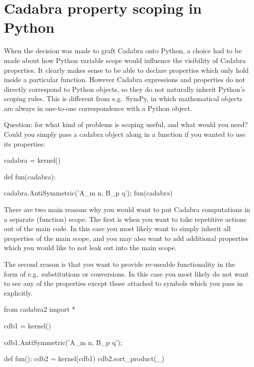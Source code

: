 
\section{Cadabra property scoping in Python}

When the decision was made to graft Cadabra onto Python, a choice had
to be made about how Python variable scope would influence the
visibility of Cadabra properties. It clearly makes sense to be able to
declare properties which only hold inside a particular
function. However Cadabra expressions and properties do not directly
correspond to Python objects, so they do not naturally inherit
Python's scoping rules. This is different from e.g.~SymPy, in which
mathematical objects are always in one-to-one correspondence with a
Python object.

Question: for what kind of problems is scoping useful, and what would
you need? Could you simply pass a cadabra object along in a function
if you wanted to use its properties:

cadabra = kernel()

def fun(cadabra):
    


cadabra.AntiSymmetric('{A_{m n}, B_{p q}}');
fun(cadabra)


There are two main reasons why you would want to put Cadabra
computations in a separate (function) scope. The first is when you
want to take repetitive actions out of the main code. In this case you
most likely want to simply inherit all properties of the main scope,
and you may also want to add additional properties which you would
like to not leak out into the main scope.

The second reason is that you want to provide re-useable functionality
in the form of e.g.~substitutions or conversions. In this case you
most likely do not want to see any of the properties except those
attached to symbols which you pass in explicitly.



from cadabra2 import *

cdb1 = kernel()

cdb1.AntiSymmetric('{A_{m n}, B_{p q}}');

def fun():
   cdb2 = kernel(cdb1)
   cdb2.sort_product(_) 
